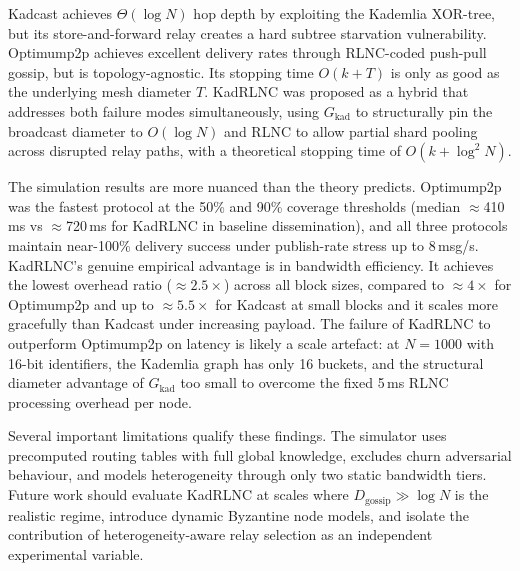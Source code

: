 \documentclass{article}
\begin{document}
Kadcast achieves $\Theta(\log N)$ hop depth by exploiting the Kademlia XOR-tree, but its store-and-forward relay creates a hard subtree starvation vulnerability. Optimump2p achieves excellent delivery rates through RLNC-coded push-pull gossip, but is topology-agnostic. Its stopping time $O(k + T)$ is only as good as the underlying mesh diameter $T$. KadRLNC was proposed as a hybrid that addresses both failure modes simultaneously, using $G_\text{kad}$ to structurally pin the broadcast diameter to $O(\log N)$ and RLNC to allow partial shard pooling across disrupted relay paths, with a theoretical stopping time of $O(k + \log^2 N)$.

The simulation results are more nuanced than the theory predicts. Optimump2p was the fastest protocol at the 50\% and 90\% coverage thresholds (median $\approx$410\,ms vs $\approx$720\,ms for KadRLNC in baseline dissemination), and all three protocols maintain near-100\% delivery success under publish-rate stress up to 8\,msg/s. KadRLNC's genuine empirical advantage is in bandwidth efficiency. It achieves the lowest overhead ratio ($\approx2.5\times$) across all block sizes, compared to $\approx 4\times$ for Optimump2p and up to $\approx5.5\times$ for Kadcast at small blocks and it scales more gracefully than Kadcast under increasing payload. The failure of KadRLNC to outperform Optimump2p on latency is likely a scale artefact: at $N = 1000$ with 16-bit identifiers, the Kademlia graph has only 16 buckets, and the structural diameter advantage of $G_\text{kad}$ too small to overcome the fixed 5\,ms RLNC processing overhead per node.

Several important limitations qualify these findings. The simulator uses precomputed routing tables with full global knowledge, excludes churn adversarial behaviour, and models heterogeneity through only two static bandwidth tiers. Future work should evaluate KadRLNC at scales where $D_\text{gossip} \gg \log N$ is the realistic regime, introduce dynamic Byzantine node models, and isolate the contribution of heterogeneity-aware relay selection as an independent experimental variable.


\end{document}
